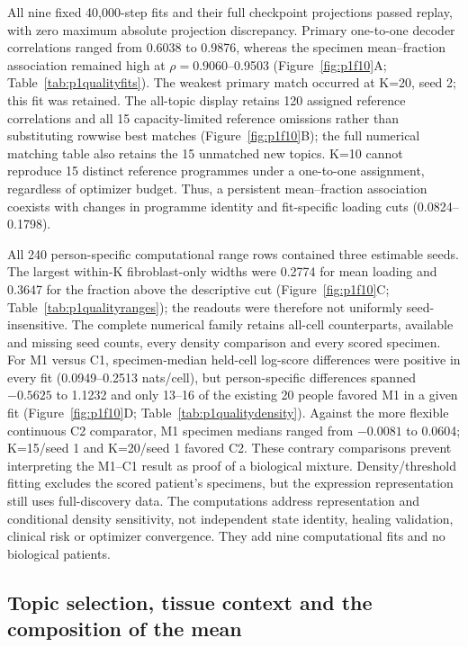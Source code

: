 \documentclass[10pt,a4paper]{article}
\begin{document}
All nine fixed 40,000-step fits and their full checkpoint projections passed replay, with zero maximum absolute projection discrepancy. Primary one-to-one decoder correlations ranged from 0.6038 to 0.9876, whereas the specimen mean--fraction association remained high at $\rho=0.9060$--0.9503 (Figure~\ref{fig:p1f10}A\label{call:p1f10}; Table~\ref{tab:p1qualityfits}). The weakest primary match occurred at K=20, seed 2; this fit was retained. The all-topic display retains 120 assigned reference correlations and all 15 capacity-limited reference omissions rather than substituting rowwise best matches (Figure~\ref{fig:p1f10}B); the full numerical matching table also retains the 15 unmatched new topics. K=10 cannot reproduce 15 distinct reference programmes under a one-to-one assignment, regardless of optimizer budget. Thus, a persistent mean--fraction association coexists with changes in programme identity and fit-specific loading cuts (0.0824--0.1798).




All 240 person-specific computational range rows contained three estimable seeds. The largest within-K fibroblast-only widths were 0.2774 for mean loading and 0.3647 for the fraction above the descriptive cut (Figure~\ref{fig:p1f10}C; Table~\ref{tab:p1qualityranges}); the readouts were therefore not uniformly seed-insensitive. The complete numerical family retains all-cell counterparts, available and missing seed counts, every density comparison and every scored specimen. For M1 versus C1, specimen-median held-cell log-score differences were positive in every fit (0.0949--0.2513 nats/cell), but person-specific differences spanned $-0.5625$ to 1.1232 and only 13--16 of the existing 20 people favored M1 in a given fit (Figure~\ref{fig:p1f10}D; Table~\ref{tab:p1qualitydensity}). Against the more flexible continuous C2 comparator, M1 specimen medians ranged from $-0.0081$ to 0.0604; K=15/seed 1 and K=20/seed 1 favored C2. These contrary comparisons prevent interpreting the M1--C1 result as proof of a biological mixture. Density/threshold fitting excludes the scored patient's specimens, but the expression representation still uses full-discovery data. The computations address representation and conditional density sensitivity, not independent state identity, healing validation, clinical risk or optimizer convergence. They add nine computational fits and no biological patients.

\subsection{Topic selection, tissue context and the composition of the mean}
\end{document}
